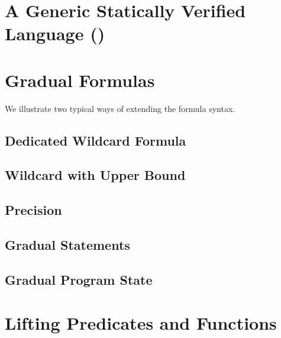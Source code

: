 \section{A Generic Statically Verified Language (\svl)}%
\label{sec:a-statically-verified}


\section{Gradual Formulas}
\label{sec:gradual-formulas}


We illustrate two typical ways of extending the formula syntax.
    \subsection{Dedicated Wildcard Formula}
    \label{ssec:dedicated-wildcard-formula}
    
    
    \subsection{Wildcard with Upper Bound}
    \label{ssec:wildcard-with-upper}
    

    \subsection{Precision}
    \label{ssec:precision}
    
    
    
    \subsection{Gradual Statements}
    \label{sec:gradual-statements}
    

    \subsection{Gradual Program State}
    \label{sec:gradual-program-state}
    

\section{Lifting Predicates and Functions}
\label{sec:lifting-predicates-and}


